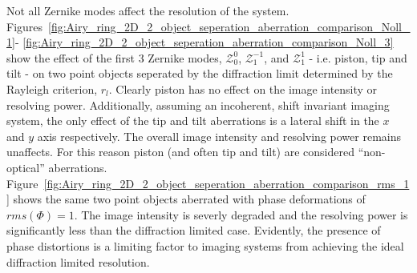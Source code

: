 Not all Zernike modes affect the resolution of the system. 
Figures~\ref{fig:Airy_ring_2D_2_object_seperation_aberration_comparison_Noll_1}-
\ref{fig:Airy_ring_2D_2_object_seperation_aberration_comparison_Noll_3}
show the effect of the first 3 Zernike modes, $\mathcal{Z}_{0}^{0}$, 
$\mathcal{Z}_{1}^{-1}$, and $\mathcal{Z}_{1}^{1}$ - i.e. piston, tip and 
tilt - on two point objects seperated by the diffraction limit determined
by the Rayleigh criterion, $r_{l}$. Clearly piston has no effect on the 
image intensity or resolving power. Additionally, assuming an incoherent, 
shift invariant imaging system, the only effect of the tip and tilt 
aberrations is a lateral shift in the $x$ and $y$ axis respectively. The
overall image intensity and resolving power remains unaffects. For this 
reason piston (and often tip and tilt) are considered ``non-optical'' 
aberrations. 
Figure~\ref{fig:Airy_ring_2D_2_object_seperation_aberration_comparison_rms_1}
shows the same two point objects aberrated with phase deformations of 
$rms(\Phi) = 1$. The image intensity is severly degraded and the resolving
power is significantly less than the diffraction limited case. Evidently, 
the presence of phase distortions is a limiting factor to imaging systems 
from achieving the ideal diffraction limited 
resolution\cite{antonello2014optimisation,booth2014adaptive}.

